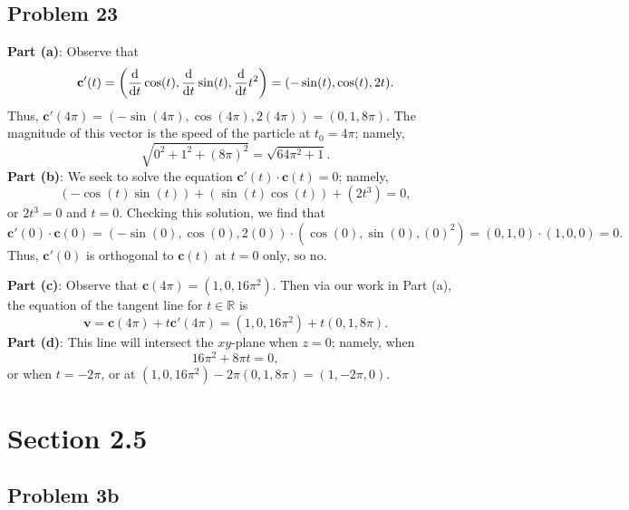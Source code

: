 \documentclass[11pt]{article}
\renewcommand{\vec}[1]{\mathbf{#1}}
\begin{document}

\subsection{Problem 23}

\textbf{Part (a)}: Observe that
\[
	\vec{c}'(t) = \left( \dv{t} \cos(t), \dv{t} \sin(t), \dv{t} t^{2} \right) = (-\sin(t), \cos(t), 2t).
\]
Thus, $\vec{c}'(4\pi) = (-\sin(4\pi), \cos(4\pi), 2(4\pi)) = (0, 1, 8\pi)$. The magnitude of this vector is the speed of the particle at $t_{0} = 4\pi$; namely,
\[
	\sqrt{0^{2} + 1^{2} + (8\pi)^{2}} = \boxed{\sqrt{64\pi^{2} + 1}}.
\]
\textbf{Part (b)}: We seek to solve the equation $\vec{c}'(t) \cdot \vec{c}(t) = 0$; namely,
\[
	(-\cos(t)\sin(t)) + (\sin(t)\cos(t)) + (2t^{3}) = 0,
\]
or $2t^{3} = 0$ and $t = 0$. Checking this solution, we find that
\[
	\vec{c}'(0) \cdot \vec{c}(0) = (-\sin(0), \cos(0), 2(0)) \cdot (\cos(0), \sin(0), (0)^{2}) = (0, 1, 0) \cdot (1, 0, 0) = 0.
\]
Thus, $\vec{c}'(0)$ is orthogonal to $\boxed{\vec{c}(t) \text{ at $t = 0$ only, so no}}$.

\textbf{Part (c)}: Observe that $\vec{c}(4\pi) = (1, 0, 16\pi^{2})$. Then via our work in Part (a), the equation of the tangent line for $t \in \mathbb{R}$ is
\[
	\vec{v} = \vec{c}(4\pi) + t \vec{c}'(4\pi) = (1, 0, 16\pi^{2}) + t(0, 1, 8\pi).
\]
\textbf{Part (d)}: This line will intersect the $xy$-plane when $z = 0$; namely, when
\[
	16\pi^{2} + 8\pi t = 0,
\]
or when $\boxed{t = -2\pi}$, or at $(1, 0, 16\pi^{2}) - 2\pi (0, 1, 8\pi)= \boxed{(1, -2\pi, 0)}$.


\section{Section 2.5}


\subsection{Problem 3b}
\end{document}
